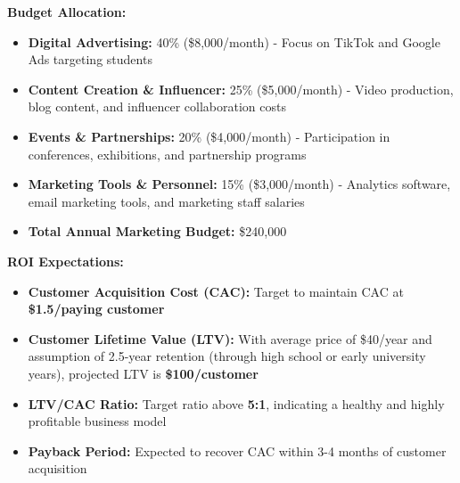 \textbf{Budget Allocation:}
\begin{itemize}
    \item \textbf{Digital Advertising:} 40\% (\$8,000/month) - Focus on TikTok and Google Ads targeting students
    \item \textbf{Content Creation \& Influencer:} 25\% (\$5,000/month) - Video production, blog content, and influencer collaboration costs
    \item \textbf{Events \& Partnerships:} 20\% (\$4,000/month) - Participation in conferences, exhibitions, and partnership programs
    \item \textbf{Marketing Tools \& Personnel:} 15\% (\$3,000/month) - Analytics software, email marketing tools, and marketing staff salaries
    \item \textbf{Total Annual Marketing Budget:} \$240,000
\end{itemize}

\textbf{ROI Expectations:}
\begin{itemize}
    \item \textbf{Customer Acquisition Cost (CAC):} Target to maintain CAC at \textbf{\$1.5/paying customer}
    \item \textbf{Customer Lifetime Value (LTV):} With average price of \$40/year and assumption of 2.5-year retention (through high school or early university years), projected LTV is \textbf{\$100/customer}
    \item \textbf{LTV/CAC Ratio:} Target ratio above \textbf{5:1}, indicating a healthy and highly profitable business model
    \item \textbf{Payback Period:} Expected to recover CAC within 3-4 months of customer acquisition
\end{itemize}